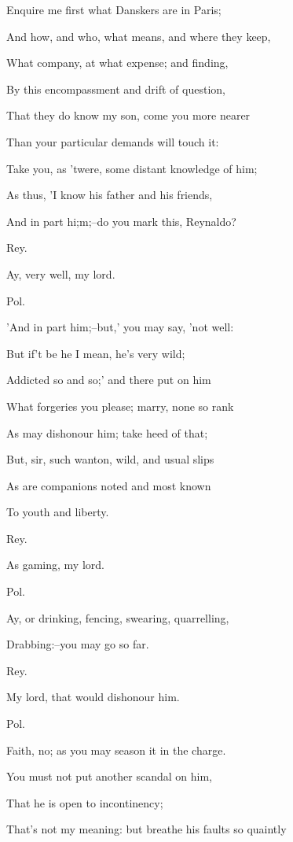 \documentclass[12pt]{book}
\begin{document}
Enquire me first what Danskers are in Paris;

And how, and who, what means, and where they keep,

What company, at what expense; and finding,

By this encompassment and drift of question,

That they do know my son, come you more nearer

Than your particular demands will touch it:

Take you, as 'twere, some distant knowledge of him;

As thus, 'I know his father and his friends,

And in part hi;m;--do you mark this, Reynaldo?



Rey.

Ay, very well, my lord.



Pol.

'And in part him;--but,' you may say, 'not well:

But if't be he I mean, he's very wild;

Addicted so and so;' and there put on him

What forgeries you please; marry, none so rank

As may dishonour him; take heed of that;

But, sir, such wanton, wild, and usual slips

As are companions noted and most known

To youth and liberty.



Rey.

As gaming, my lord.



Pol.

Ay, or drinking, fencing, swearing, quarrelling,

Drabbing:--you may go so far.



Rey.

My lord, that would dishonour him.



Pol.

Faith, no; as you may season it in the charge.

You must not put another scandal on him,

That he is open to incontinency;

That's not my meaning: but breathe his faults so quaintly
\end{document}
